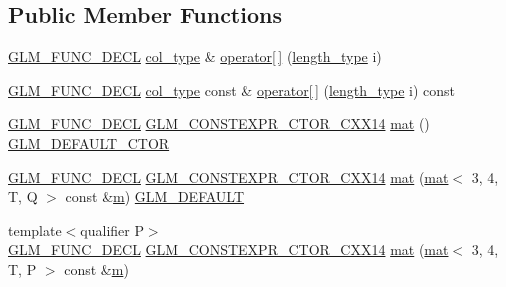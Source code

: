 \subsection*{Public Member Functions}
\begin{DoxyCompactItemize}
\item 
\hyperlink{setup_8hpp_ab2d052de21a70539923e9bcbf6e83a51}{G\+L\+M\+\_\+\+F\+U\+N\+C\+\_\+\+D\+E\+CL} \hyperlink{structglm_1_1mat_3_013_00_014_00_01_t_00_01_q_01_4_aaa23c4674cbe2dc1eda1d826b8ef721e}{col\+\_\+type} \& \hyperlink{structglm_1_1mat_3_013_00_014_00_01_t_00_01_q_01_4_a2cc3ce3e5d6807a9ec433b51f16ecd8a}{operator\mbox{[}$\,$\mbox{]}} (\hyperlink{structglm_1_1mat_3_013_00_014_00_01_t_00_01_q_01_4_a6a07c3870b8e6d4ba5f1ec8fa988d9bf}{length\+\_\+type} i)
\item 
\hyperlink{setup_8hpp_ab2d052de21a70539923e9bcbf6e83a51}{G\+L\+M\+\_\+\+F\+U\+N\+C\+\_\+\+D\+E\+CL} \hyperlink{structglm_1_1mat_3_013_00_014_00_01_t_00_01_q_01_4_aaa23c4674cbe2dc1eda1d826b8ef721e}{col\+\_\+type} const  \& \hyperlink{structglm_1_1mat_3_013_00_014_00_01_t_00_01_q_01_4_a1abef793b9078730b053df8ff6a37256}{operator\mbox{[}$\,$\mbox{]}} (\hyperlink{structglm_1_1mat_3_013_00_014_00_01_t_00_01_q_01_4_a6a07c3870b8e6d4ba5f1ec8fa988d9bf}{length\+\_\+type} i) const
\item 
\hyperlink{setup_8hpp_ab2d052de21a70539923e9bcbf6e83a51}{G\+L\+M\+\_\+\+F\+U\+N\+C\+\_\+\+D\+E\+CL} \hyperlink{setup_8hpp_a0900f9145e68bf6061b6f5e7be3fa751}{G\+L\+M\+\_\+\+C\+O\+N\+S\+T\+E\+X\+P\+R\+\_\+\+C\+T\+O\+R\+\_\+\+C\+X\+X14} \hyperlink{structglm_1_1mat_3_013_00_014_00_01_t_00_01_q_01_4_ab9511e49e913947be5af4f97b0703de7}{mat} () \hyperlink{setup_8hpp_afb97a4e995bc004c0cbbfa22125b80ba}{G\+L\+M\+\_\+\+D\+E\+F\+A\+U\+L\+T\+\_\+\+C\+T\+OR}
\item 
\hyperlink{setup_8hpp_ab2d052de21a70539923e9bcbf6e83a51}{G\+L\+M\+\_\+\+F\+U\+N\+C\+\_\+\+D\+E\+CL} \hyperlink{setup_8hpp_a0900f9145e68bf6061b6f5e7be3fa751}{G\+L\+M\+\_\+\+C\+O\+N\+S\+T\+E\+X\+P\+R\+\_\+\+C\+T\+O\+R\+\_\+\+C\+X\+X14} \hyperlink{structglm_1_1mat_3_013_00_014_00_01_t_00_01_q_01_4_a7c4d69ea49d8271382c7d08e14c16a25}{mat} (\hyperlink{structglm_1_1mat}{mat}$<$ 3, 4, T, Q $>$ const \&\hyperlink{_s_d_l__opengl__glext_8h_af593500c283bf1a787a6f947f503a5c2}{m}) \hyperlink{setup_8hpp_aefce7051c376a64ba89fa93a9f63bc2c}{G\+L\+M\+\_\+\+D\+E\+F\+A\+U\+LT}
\item 
{\footnotesize template$<$qualifier P$>$ }\\\hyperlink{setup_8hpp_ab2d052de21a70539923e9bcbf6e83a51}{G\+L\+M\+\_\+\+F\+U\+N\+C\+\_\+\+D\+E\+CL} \hyperlink{setup_8hpp_a0900f9145e68bf6061b6f5e7be3fa751}{G\+L\+M\+\_\+\+C\+O\+N\+S\+T\+E\+X\+P\+R\+\_\+\+C\+T\+O\+R\+\_\+\+C\+X\+X14} \hyperlink{structglm_1_1mat_3_013_00_014_00_01_t_00_01_q_01_4_a04c8fa43e36e082b099a3c7603ad8453}{mat} (\hyperlink{structglm_1_1mat}{mat}$<$ 3, 4, T, P $>$ const \&\hyperlink{_s_d_l__opengl__glext_8h_af593500c283bf1a787a6f947f503a5c2}{m})

\end{DoxyCompactItemize}
